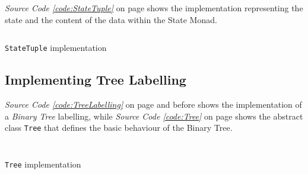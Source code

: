 \documentclass[a4paper,12pt,twoside]{scrreprt}
\begin{document}
\textit{Source Code \ref{code:StateTuple}} on page \pageref{code:StateTuple} shows the implementation representing the state and the content of the data within the State Monad.

\begin{listing}[ht]
    \inputminted[fontsize=\footnotesize,linenos,breaklines,breakanywhere]{java}{./code/statemonad/StateTuple.java}
    \caption[\texttt{StateTuple} implementation]{\texttt{StateTuple} implementation}
    \label{code:StateTuple}
\end{listing}
\clearpage

\subsection{Implementing Tree Labelling}
\textit{Source Code \ref{code:TreeLabelling}} on page \pageref{code:TreeLabelling} and before shows the implementation of a \textit{Binary Tree} labelling, while \textit{Source Code \ref{code:Tree}} on page \pageref{code:Tree} shows the abstract class  \texttt{Tree} that defines the basic behaviour of the Binary Tree.

\inputminted[fontsize=\footnotesize,linenos,breaklines,breakanywhere]{java}{./code/statemonad/Labelling.java}

\begin{listing}[ht]
    \inputminted[fontsize=\footnotesize,linenos,breaklines,breakanywhere]{java}{./code/statemonad/Tree.java}
    \caption[\texttt{Tree} implementation]{\texttt{Tree} implementation}
    \label{code:Tree}
\end{listing}

\clearpage
{}
{}
\printbibliography
\end{document}
